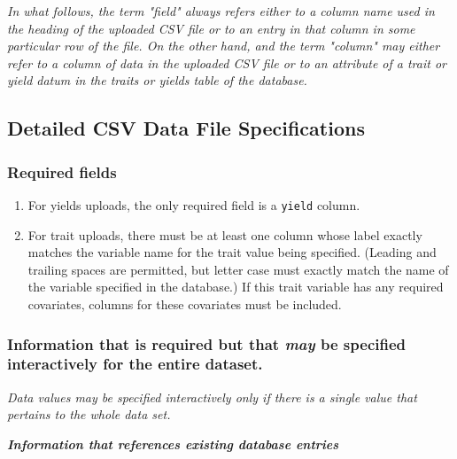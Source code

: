 \textit{In what follows, the term "field" always refers either to a column name used in the heading of the uploaded CSV file or to an entry in that column in some particular row of the file.  On the other hand, and the term "column" may either refer to a column of data in the uploaded CSV file or to an attribute of a trait or yield datum in the traits or yields table of the database.}

\subsection{Detailed CSV Data File Specifications}

\subsubsection{Required fields}

\begin{enumerate}
\item For yields uploads, the only required field is a \verb|yield| column.
\item For trait uploads, there must be at least one column whose label exactly matches the variable name for the trait value being specified.  (Leading and trailing spaces are permitted, but letter case must exactly match the name of the variable specified in the database.)  If this trait variable has any required covariates, columns for these covariates must be included.
\end{enumerate}

\subsubsection{Information that is required but that \textit{may} be specified interactively for the entire dataset.}

\textit{Data values may be specified interactively only if there is a single value that pertains to the whole data set.}

\textbf{\textit{Information that references existing database entries}}

